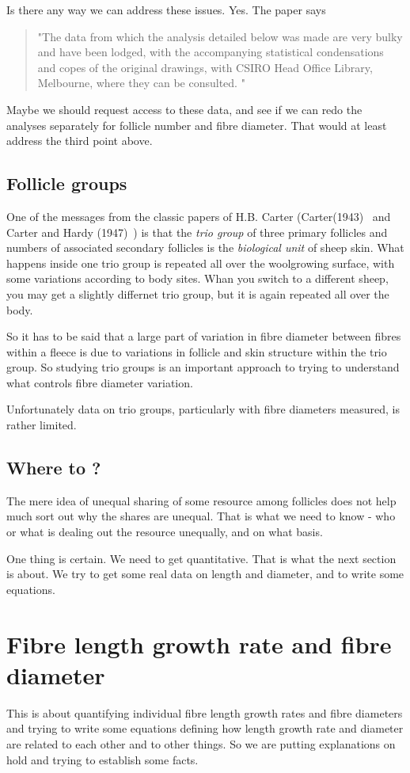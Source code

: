 \documentclass[titlepage]{article}  %
\begin{document}
Is there any way we can address these issues. Yes. The paper says
\begin{quote}
"The data from which the analysis detailed below was made are very bulky and have been lodged, with the accompanying statistical condensations and copes of the original drawings, with CSIRO Head Office Library, Melbourne, where they can be consulted. "
\end{quote}
Maybe we should request access to these data, and see if we can redo the analyses separately for follicle number and fibre diameter. That would at least address the third point above.

\subsection{Follicle groups}
One of the messages from the classic papers of H.B. Carter (Carter(1943)~\cite{cart:43} and Carter and Hardy (1947)~\cite{cart:47}) is that the {\em trio group} of three primary follicles and numbers of associated secondary follicles is the {\em biological unit} of sheep skin. What happens inside one trio group is repeated all over the woolgrowing surface, with some variations according to body sites. Whan you switch to  a different sheep, you may get a slightly differnet trio group, but it is again repeated all over the body.

So it has to be said that a large part of variation in fibre diameter between fibres within a fleece is due to variations in follicle and skin structure within the trio group. So studying trio groups is an important approach to trying to understand what controls fibre diameter variation. 

Unfortunately data on trio groups, particularly with fibre diameters measured, is rather limited. 

\subsection{Where to ?}
The mere idea of unequal sharing of some resource among follicles does not help much sort out why the shares are unequal. That is what we need to know - who or what is dealing out the resource unequally, and on what basis.

One thing is certain. We need to get quantitative.  That is what the next section is about. We try to get some real data on length and diameter, and to write some equations.

\section{Fibre length growth rate and fibre diameter}
This is about quantifying individual fibre length growth rates and fibre diameters and trying to write some equations defining how length growth rate and diameter are related to each other and to other things. So we are putting explanations on hold and trying to establish some facts.
\end{document}
